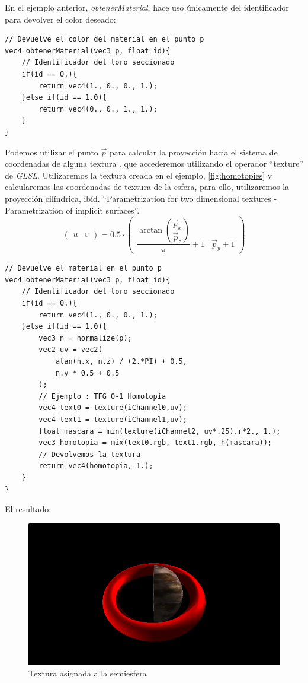 En el ejemplo anterior, \textit{obtenerMaterial}, hace uso únicamente del identificador para devolver el color deseado:

\begin{lstlisting}
// Devuelve el color del material en el punto p
vec4 obtenerMaterial(vec3 p, float id){
    // Identificador del toro seccionado
    if(id == 0.){
        return vec4(1., 0., 0., 1.);
    }else if(id == 1.0){
        return vec4(0., 0., 1., 1.);
    }
}
\end{lstlisting}

Podemos utilizar el punto \(\Vec{p}\) para calcular la proyección hacia el sistema de coordenadas de alguna textura \cite{projections}. que accederemos utilizando el operador \enquote{texture} de \textit{GLSL}. Utilizaremos la textura creada en el ejemplo, \ref{fig:homotopies} y calcularemos las coordenadas de textura de la esfera, para ello, utilizaremos la proyección cilíndrica, ibíd. \enquote{Parametrization for two dimensional textures - Parametrization of implicit surfaces}.
\[\begin{pmatrix}
    u&
    v
\end{pmatrix}=  0.5\cdot
\begin{pmatrix}
    \dfrac{\arctan\left(\dfrac{\Vec{p}_x}{\Vec{p}_z}\right)}{\pi}+1&
    \Vec{p}_y + 1
\end{pmatrix}
\]

\begin{lstlisting}
// Devuelve el material en el punto p
vec4 obtenerMaterial(vec3 p, float id){
    // Identificador del toro seccionado
    if(id == 0.){
        return vec4(1., 0., 0., 1.);
    }else if(id == 1.0){
    	vec3 n = normalize(p);
        vec2 uv = vec2(
            atan(n.x, n.z) / (2.*PI) + 0.5,
            n.y * 0.5 + 0.5
        );
        // Ejemplo : TFG 0-1 Homotopía
        vec4 text0 = texture(iChannel0,uv);
        vec4 text1 = texture(iChannel1,uv);
        float mascara = min(texture(iChannel2, uv*.25).r*2., 1.);
        vec3 homotopia = mix(text0.rgb, text1.rgb, h(mascara));
        // Devolvemos la textura
        return vec4(homotopia, 1.);
    }
}
\end{lstlisting}

El resultado:

\begin{figure}[H]
  \centering
  \captionsetup{justification=centering}%
  \includegraphics[width=1.0\textwidth]{secciones/imagenes/material/textura.png}
  \caption{Textura asignada a la semiesfera}
  \label{fig:texture}
\end{figure}